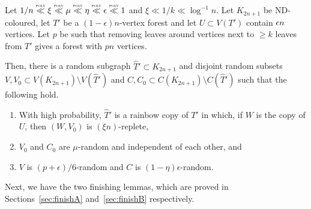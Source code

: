 \begin{theorem}\label{nearembedagain} Let $1/n\ll  \xi\ll \mu\ll \eta\ll \eps\ll 1$ and $\xi\ll 1/k\ll \log^{-1}n$.
Let $K_{2n+1}$ be ND-coloured, let $T'$ be a $(1-\epsilon)n$-vertex forest and let $U\subset V(T')$ contain $\epsilon n$ vertices. Let $p$ be such that removing leaves around vertices next to $\geq k$ leaves from $T'$ gives a forest with $pn$ vertices.

Then, there is a random subgraph $\hat{T}'\subset K_{2n+1}$ and disjoint random subsets $V,V_0\subset V(K_{2n+1})\setminus V(\hat{T}')$ and $C,C_0\subset C(K_{2n+1})\setminus C(\hat{T}')$ such that the following hold.
\begin{enumerate}[label = {\bfseries \Alph{propcounter}\arabic{enumi}}]
\item With high probability, $\hat{T}'$ is a rainbow copy of $T'$ in which, if $W$ is the copy of $U$, then $(W,V_0)$ is $(\xi n)$-replete,\label{propa1}
\item $V_0$ and $C_0$ are $\mu$-random and independent of each other, and\label{propa2}
\item $V$ is $(p+\epsilon)/6$-random and $C$ is $(1-\eta)\epsilon$-random.\label{propa3}
\end{enumerate}
\end{theorem}

Next, we have the two finishing lemmas, which are proved in Sections~\ref{sec:finishA} and~\ref{sec:finishB} respectively.

